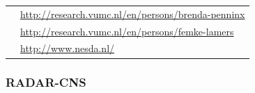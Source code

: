 \documentclass[]{book}
\begin{document}
\begin{longtable}[]{@{}ll@{}}
\begin{minipage}[t]{0.25\columnwidth}
\end{minipage} & \begin{minipage}[t]{0.69\columnwidth}\raggedright\strut
\url{http://research.vumc.nl/en/persons/brenda-penninx}\strut
\end{minipage}\tabularnewline
\begin{minipage}[t]{0.25\columnwidth}\raggedright\strut
\strut
\end{minipage} & \begin{minipage}[t]{0.69\columnwidth}\raggedright\strut
\url{http://research.vumc.nl/en/persons/femke-lamers}\strut
\end{minipage}\tabularnewline
\begin{minipage}[t]{0.25\columnwidth}\raggedright\strut
\strut
\end{minipage} & \begin{minipage}[t]{0.69\columnwidth}\raggedright\strut
\url{http://www.nesda.nl/}\strut
\end{minipage}\tabularnewline
\bottomrule
\end{longtable}

\subsubsection{RADAR-CNS}\label{radar-cns}

\end{document}
